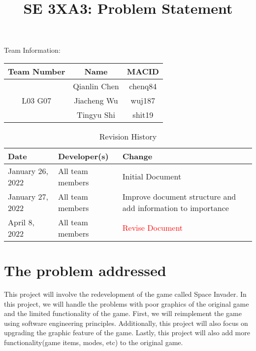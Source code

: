 \documentclass[12pt]{article}
\title{SE 3XA3: Problem Statement}
\begin{document}
\maketitle

{\Large Team Information:}
\begin{table}[htp]
\centering
{\Large
\begin{tabular}{|c|c|c|}
\hline
\multicolumn{1}{|l|}{Team Number} & Name         & MACID   \\ \hline
\multirow{3}{*}{L03 G07}          & Qianlin Chen & chenq84 \\ \cline{2-3} 
                                  & Jiacheng Wu  & wuj187  \\ \cline{2-3} 
                                  & Tingyu Shi   & shit19  \\ \hline
\end{tabular}
}
\end{table}

\begin{table}[htp]
\caption{Revision History} 
\begin{tabularx}{\textwidth}{llX}
\toprule
\textbf{Date} & \textbf{Developer(s)} & \textbf{Change}\\
\midrule
January 26, 2022 & All team members & Initial Document\\
January 27, 2022 & All team members & Improve document structure and add information to importance\\
April 8, 2022 & All team members & \textcolor{red}{Revise Document}\\
\bottomrule
\end{tabularx}
\end{table}

\newpage



\section{The problem addressed}
This project will involve the redevelopment of the game called Space Invader. In this project, we will handle the problems with poor graphics of the original game and the limited functionality of the game. First, we will reimplement the game using software engineering principles. Additionally, this project will also focus on upgrading the graphic feature of the game. Lastly, this project will also add more functionality(game items, modes, etc) to the original game.
\end{document}
